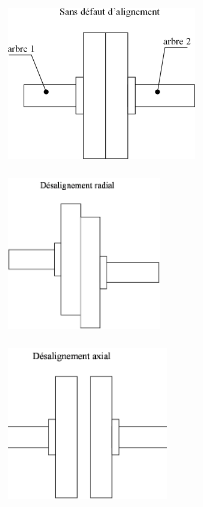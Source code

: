 \documentclass[11pt,oneside]{article}
\begin{document}
\noindent\begin{minipage}[c]{.3\linewidth}
\begin{center}
\includegraphics[height=4cm]{png/fig_03}
\end{center}
\end{minipage} \hfill
\begin{minipage}[c]{.3\linewidth}
\begin{center}
\includegraphics[height=4cm]{png/fig_05}
\end{center}
\end{minipage} \hfill
\begin{minipage}[c]{.3\linewidth}
\begin{center}
\includegraphics[height=4cm]{png/fig_06}
\end{center}
\end{minipage} 
\end{document}
